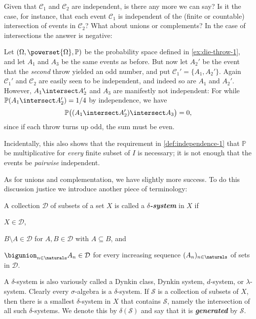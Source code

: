 \documentclass[article, a4paper, 11pt, oneside]{memoir}
\numberwithin{equation}{chapter}
\newcommand{\calC}{\mathcal{C}}
\newcommand{\calD}{\mathcal{D}}
\newcommand{\calS}{\mathcal{S}}
\renewcommand{\P}{\mathbb{P}}
\newcommand{\keyword}[1]{{\itshape\bfseries #1}}
\begin{document}
Given that $\calC_1$ and $\calC_2$ are independent, is there any more we can say? Is it the case, for instance, that each event $\calC_1$ is independent of the (finite or countable) intersection of events in $\calC_2$? What about unions or complements? In the case of intersections the answer is negative:

\begin{example}
    \label{ex:die-throw-2}
    Let $(\Omega,\powerset{\Omega},\P)$ be the probability space defined in \cref{ex:die-throw-1}, and let $A_1$ and $A_3$ be the same events as before. But now let $A_2'$ be the event that the \emph{second} throw yielded an odd number, and put $\calC_1' = \{A_1, A_2'\}$. Again $\calC_1'$ and $\calC_2$ are easily seen to be independent, and indeed so are $A_1$ and $A_2'$. However, $A_1 \intersect A_2'$ and $A_3$ are manifestly not independent: For while $\P(A_1 \intersect A_2') = 1/4$ by independence, we have
    \begin{equation*}
        \P \bigl( (A_1 \intersect A_2') \intersect A_3 \bigr)
            = 0,
    \end{equation*}
    since if each throw turns up odd, the sum must be even.

    Incidentally, this also shows that the requirement in \cref{def:independence-1} that $\P$ be multiplicative for \emph{every} finite subset of $I$ is necessary; it is not enough that the events be \emph{pairwise} independent.
\end{example}

As for unions and complementation, we have slightly more success. To do this discussion justice we introduce another piece of terminology:

\begin{definition}
    A collection $\calD$ of subsets of a set $X$ is called a \keyword{$\delta$-system} in $X$ if
    \begin{enumdef}
        \item $X \in \calD$,
        \item $B \setminus A \in \calD$ for $A,B \in \calD$ with $A \subseteq B$, and
        \item $\bigunion_{n\in\naturals} A_n \in \calD$ for every increasing sequence $(A_n)_{n\in\naturals}$ of sets in $\calD$.
    \end{enumdef}
\end{definition}
%
A $\delta$-system is also variously called a Dynkin class, Dynkin system, $d$-system, or $\lambda$-system. Clearly every $\sigma$-algebra is a $\delta$-system. If $\calS$ is a collection of subsets of $X$, then there is a smallest $\delta$-system in $X$ that contains $\calS$, namely the intersection of all such $\delta$-systems. We denote this by $\delta(\calS)$ and say that it is \keyword{generated} by $\calS$.
\end{document}
